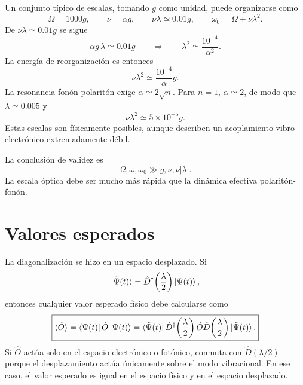 \documentclass[11pt]{article}
\begin{document}
Un conjunto t\'ipico de escalas, tomando $g$ como unidad, puede organizarse
como
\begin{equation}
  \Omega=1000g,
  \qquad
  \nu=\alpha g,
  \qquad
  \nu\lambda\simeq0.01g,
  \qquad
  \omega_0=\Omega+\nu\lambda^2.
\end{equation}
De $\nu\lambda\simeq0.01g$ se sigue
\begin{equation}
  \alpha g\,\lambda\simeq0.01g
  \qquad\Rightarrow\qquad
  \lambda^2\simeq\frac{10^{-4}}{\alpha^2}.
\end{equation}
La energ\'ia de reorganizaci\'on es entonces
\begin{equation}
  \nu\lambda^2\simeq\frac{10^{-4}}{\alpha}g.
\end{equation}
La resonancia fon\'on-polarit\'on exige $\alpha\simeq2\sqrt n$. Para $n=1$,
$\alpha\simeq2$, de modo que $\lambda\simeq0.005$ y
\begin{equation}
  \nu\lambda^2\simeq5\times10^{-5}g.
\end{equation}
Estas escalas son f\'isicamente posibles, aunque describen un acoplamiento
vibro-electr\'onico extremadamente d\'ebil.

La conclusi\'on de validez es
\begin{equation}
  \boxed{
  \Omega,\omega,\omega_0\gg g,\nu,\nu|\lambda|.
  }
\end{equation}
La escala \'optica debe ser mucho m\'as r\'apida que la din\'amica efectiva
polarit\'on-fon\'on.

\section{Valores esperados}

La diagonalizaci\'on se hizo en un espacio desplazado. Si
\begin{equation}
  \ket{\tilde\Psi(t)}
  =
  \hat D^\dagger\!\left(\frac{\lambda}{2}\right)
  \ket{\Psi(t)},
\end{equation}
entonces cualquier valor esperado f\'isico debe calcularse como
\begin{equation}
  \boxed{
  \langle\hat O\rangle
  =
  \bra{\Psi(t)}\hat O\ket{\Psi(t)}
  =
  \bra{\tilde\Psi(t)}
  \hat D^\dagger\!\left(\frac{\lambda}{2}\right)
  \hat O
  \hat D\!\left(\frac{\lambda}{2}\right)
  \ket{\tilde\Psi(t)}.
  }
\end{equation}
Si $\hat O$ act\'ua solo en el espacio electr\'onico o fot\'onico, conmuta con
$\hat D(\lambda/2)$ porque el desplazamiento act\'ua \'unicamente sobre el
modo vibracional. En ese caso, el valor esperado es igual en el espacio
f\'isico y en el espacio desplazado.
\end{document}
